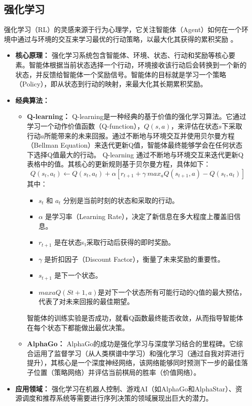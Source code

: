 \subsection{强化学习}
\label{ssec:reinforcement_learning}
强化学习（RL）的灵感来源于行为心理学，它关注智能体（Agent）如何在一个环境中通过与环境的交互来学习最优的行动策略，以最大化其获得的累积奖励 \cite{shakya2023reinforcement}。
\begin{itemize}
    \item \textbf{核心原理：} 强化学习系统包含智能体、环境、状态、行动和奖励等核心要素。智能体根据当前状态选择一个行动，环境接收该行动后会转换到一个新的状态，并反馈给智能体一个奖励信号。智能体的目标就是学习一个策略（Policy），即从状态到行动的映射，来最大化其长期累积奖励。
    \item \textbf{经典算法：}
        \begin{itemize}
            \item \textbf{Q-learning：} Q-learning是一种经典的基于价值的强化学习算法。它通过学习一个动作价值函数（Q-function），$Q(s, a)$，来评估在状态$s$下采取行动$a$所能带来的未来回报。通过不断地与环境交互并使用贝尔曼方程（Bellman Equation）来迭代更新Q值，智能体最终能够学会在任何状态下选择Q值最大的行动。
            Q-learning 通过不断地与环境交互来迭代更新Q表格中的值。其核心的更新规则基于贝尔曼方程，具体如下：
			\[
				Q(s_{t},a_{t})\leftarrow Q(s_{t},a_{t})+\alpha[r_{t+1}+\gamma~max_{a}Q(s_{t+1},a)-Q(s_{t},a_{t})]
			\]
			其中：
			\begin{itemize}
				\item $s_t$ 和 $a_t$ 分别是当前时刻的状态和采取的行动。
				\item $\alpha$ 是学习率（Learning Rate），决定了新信息在多大程度上覆盖旧信息。
				\item $r_{t+1}$ 是在状态s₁采取行动后获得的即时奖励。
				\item $\gamma$ 是折扣因子（Discount Factor），衡量了未来奖励的重要性。
				\item $s_{t+1}$ 是下一个状态。
				\item $maxa Q(St+1, a)$是对下一个状态所有可能行动的Q值的最大预估，代表了对未来回报的最佳期望。
			\end{itemize}
			智能体的训练实验是否成功，就看Q函数最终能否收敛，从而指导智能体在每个状态下都能做出最优决策。
            \item \textbf{AlphaGo：} AlphaGo的成功是强化学习与深度学习结合的里程碑。它综合运用了监督学习（从人类棋谱中学习）和强化学习（通过自我对弈进行提升），其核心是一个深度神经网络，该网络能够同时预测下一步的最佳落子位置（策略网络）并评估当前棋局的胜率（价值网络）。
        \end{itemize}
    \item \textbf{应用领域：} 强化学习在机器人控制、游戏AI（如AlphaGo和AlphaStar）、资源调度和推荐系统等需要进行序列决策的领域展现出巨大的潜力。
\end{itemize}

